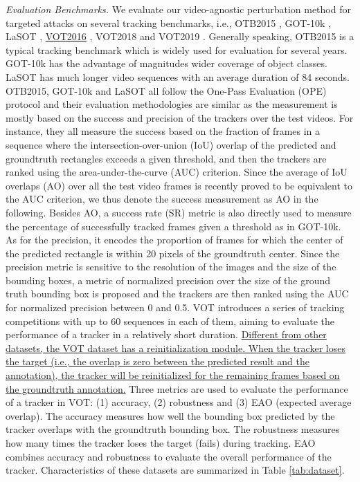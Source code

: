 \documentclass[journal]{IEEEtran}
\newcommand{\ie}{i.e.}
\begin{document}
\textit{Evaluation Benchmarks.} We evaluate our video-agnostic perturbation method for targeted attacks on several tracking benchmarks, \ie, OTB2015 \cite{OTB}, GOT-10k \cite{GOT-10k}, LaSOT \cite{LaSOT}, \uline{VOT2016} \cite{VOT2016}, VOT2018 \cite{VOT2018} and VOT2019 \cite{VOT2019}.
Generally speaking, OTB2015 is a typical tracking benchmark which is widely used for evaluation for several years. 
GOT-10k has the advantage of magnitudes wider coverage of object classes. 
LaSOT has much longer video sequences with an average duration of 84 seconds.
OTB2015, GOT-10k and LaSOT all follow the One-Pass Evaluation (OPE) protocol and their evaluation methodologies are similar as the measurement is mostly based on the success and precision of the trackers over the test videos. For instance, they all measure the success based on the fraction of frames in a sequence where the intersection-over-union (IoU) overlap of the predicted and groundtruth rectangles exceeds a given threshold, and then the trackers are ranked using the area-under-the-curve (AUC) criterion. Since the average of IoU overlaps (AO) over all the test video frames is recently proved to be equivalent to the AUC criterion, we thus denote the success measurement as AO in the following. Besides AO, a success rate (SR) metric is also directly used to measure the percentage of successfully tracked frames given a threshold as in GOT-10k. As for the precision, it encodes the proportion of frames for which the center of the predicted rectangle is within 20 pixels of the groundtruth center. Since the precision metric is sensitive to the resolution of the images and the size of the bounding boxes, a metric of normalized precision over the size of the ground truth bounding box is proposed and the trackers are then ranked using the AUC for normalized precision between 0 and 0.5. 
VOT \cite{VOT2016,VOT2018,VOT2019} introduces a series of tracking competitions with up to 60 sequences in each of them, aiming to evaluate the performance of a tracker in a relatively short duration. 
\uline{Different from other datasets, the VOT dataset has a reinitialization module. When the tracker loses the target (\ie, the overlap is zero between the predicted result and the annotation), the tracker will be reinitialized for the remaining frames based on the groundtruth annotation.}
Three metrics are used to evaluate the performance of a tracker in VOT: (1) accuracy, (2) robustness and (3) EAO (expected average overlap). The accuracy measures how well the bounding box predicted by the tracker overlaps with the groundtruth bounding box. The robustness measures how many times the tracker loses the target (fails) during tracking. EAO combines accuracy and robustness to evaluate the overall performance of the tracker.
Characteristics of these datasets are summarized in Table \ref{tab:dataset}.
\end{document}
